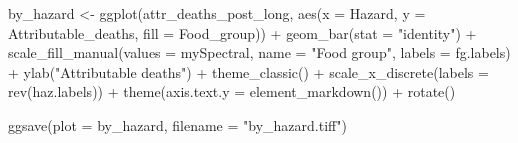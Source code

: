 \documentclass[
  letterpaper,
  DIV=11,
  numbers=noendperiod]{scrartcl}
\newenvironment{Shaded}{\begin{snugshade}}{\end{snugshade}}
\newcommand{\AttributeTok}[1]{\textcolor[rgb]{0.40,0.45,0.13}{#1}}
\newcommand{\FunctionTok}[1]{\textcolor[rgb]{0.28,0.35,0.67}{#1}}
\newcommand{\NormalTok}[1]{\textcolor[rgb]{0.00,0.23,0.31}{#1}}
\newcommand{\OtherTok}[1]{\textcolor[rgb]{0.00,0.23,0.31}{#1}}
\newcommand{\SpecialCharTok}[1]{\textcolor[rgb]{0.37,0.37,0.37}{#1}}
\newcommand{\StringTok}[1]{\textcolor[rgb]{0.13,0.47,0.30}{#1}}
\begin{document}
\begin{Shaded}
\begin{Highlighting}[]
\NormalTok{by\_hazard }\OtherTok{\textless{}{-}} 
  \FunctionTok{ggplot}\NormalTok{(attr\_deaths\_post\_long, }\FunctionTok{aes}\NormalTok{(}\AttributeTok{x =}\NormalTok{ Hazard, }\AttributeTok{y =}\NormalTok{ Attributable\_deaths, }\AttributeTok{fill =}\NormalTok{ Food\_group)) }\SpecialCharTok{+} 
  \FunctionTok{geom\_bar}\NormalTok{(}\AttributeTok{stat =} \StringTok{"identity"}\NormalTok{) }\SpecialCharTok{+}
  \FunctionTok{scale\_fill\_manual}\NormalTok{(}\AttributeTok{values =}\NormalTok{ mySpectral, }\AttributeTok{name =} \StringTok{"Food group"}\NormalTok{, }\AttributeTok{labels =}\NormalTok{ fg.labels) }\SpecialCharTok{+}
  \FunctionTok{ylab}\NormalTok{(}\StringTok{"Attributable deaths"}\NormalTok{) }\SpecialCharTok{+}
  \FunctionTok{theme\_classic}\NormalTok{() }\SpecialCharTok{+}
  \FunctionTok{scale\_x\_discrete}\NormalTok{(}\AttributeTok{labels =} \FunctionTok{rev}\NormalTok{(haz.labels)) }\SpecialCharTok{+}
  \FunctionTok{theme}\NormalTok{(}\AttributeTok{axis.text.y =} \FunctionTok{element\_markdown}\NormalTok{()) }\SpecialCharTok{+}
  \FunctionTok{rotate}\NormalTok{()}

\FunctionTok{ggsave}\NormalTok{(}\AttributeTok{plot =}\NormalTok{ by\_hazard, }\AttributeTok{filename =} \StringTok{"by\_hazard.tiff"}\NormalTok{)}
\end{Highlighting}
\end{Shaded}
\end{document}
